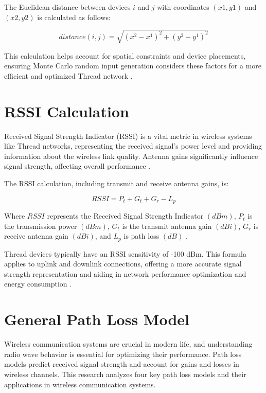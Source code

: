 The Euclidean distance between devices $i$ and $j$ with coordinates $(x1, y1)$ and $(x2, y2)$ is calculated as follows:

\begin{equation}\label{eq:euclidean_distance}
    distance\left(i,j\right)=\sqrt{\left(x^2-x^1\right)^2+\left(y^2-y^1\right)^2}
\end{equation}

This calculation helps account for spatial constraints and device placements, ensuring Monte Carlo random input generation considers these factors for a more efficient and optimized Thread network \cite{dokmanic2015euclidean}.

\section{RSSI Calculation}\label{sec:rssi_calculation}
Received Signal Strength Indicator (RSSI) is a vital metric in wireless systems like Thread networks, representing the received signal's power level and providing information about the wireless link quality. Antenna gains significantly influence signal strength, affecting overall performance \cite{benkic2008rssi}.

The RSSI calculation, including transmit and receive antenna gains, is:

\begin{equation}\label{eq:rssi_calculation_2}
    RSSI=P_t+G_t+G_r-L_p
\end{equation}

    Where $RSSI$ represents the Received Signal Strength Indicator $(dBm)$, $P_t$ is the transmission power $(dBm)$, $G_t$ is the transmit antenna gain $(dBi)$, $G_r$ is receive antenna gain $(dBi)$, and $L_p$ is path loss $(dB)$ \cite{doi:10.1155/2014/371350}.

\vspace{2mm}
Thread devices typically have an RSSI sensitivity of -100 dBm. This formula applies to uplink and downlink connections, offering a more accurate signal strength representation and aiding in network performance optimization and energy consumption \cite{semiconductor_nrf52840_2018_1}.

\section{General Path Loss Model}\label{sec:general_path_loss_model}
Wireless communication systems are crucial in modern life, and understanding radio wave behavior is essential for optimizing their performance. Path loss models predict received signal strength and account for gains and losses in wireless channels. This research analyzes four key path loss models and their applications in wireless communication systems.

